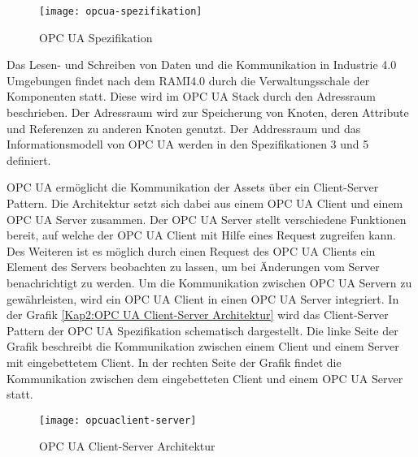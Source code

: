 \begin{figure}[h]
  \centering
  \texttt{[image: opcua-spezifikation]}
  \caption{OPC UA Spezifikation} 
  \label{Grundlagen:OPC UA Spezification}
\end{figure}

Das Lesen- und Schreiben von Daten und die Kommunikation in Industrie 4.0 Umgebungen findet nach dem \ac{RAMI4.0} durch die Verwaltungsschale der Komponenten statt. Diese wird im \ac{OPC UA} Stack durch den Adressraum beschrieben. Der Adressraum wird zur Speicherung von Knoten, deren Attribute und Referenzen zu anderen Knoten genutzt. Der Addressraum und das Informationsmodell von \ac{OPC UA} werden in den Spezifikationen 3 \cite{opcpt3} und 5 \cite{opcpt5} definiert.

\ac{OPC UA} ermöglicht die Kommunikation der Assets über ein Client-Server Pattern. Die Architektur setzt sich dabei aus einem \ac{OPC UA} Client und einem \ac{OPC UA} Server zusammen. Der \ac{OPC UA} Server stellt verschiedene Funktionen bereit, auf welche der \ac{OPC UA} Client mit Hilfe eines Request zugreifen kann. Des Weiteren ist es möglich durch einen Request des \ac{OPC UA} Clients ein Element des Servers beobachten zu lassen, um bei Änderungen vom Server benachrichtigt zu werden. Um die Kommunikation zwischen \ac{OPC UA} Servern zu gewährleisten, wird ein \ac{OPC UA} Client in einen \ac{OPC UA} Server integriert. In der Grafik \autoref{Kap2:OPC UA Client-Server Architektur} wird das Client-Server Pattern der \ac{OPC UA} Spezifikation schematisch dargestellt. Die linke Seite der Grafik beschreibt die Kommunikation zwischen einem Client und einem Server mit eingebettetem Client. In der rechten Seite der Grafik findet die Kommunikation zwischen dem eingebetteten Client und einem \ac{OPC UA} Server statt.

\begin{figure}[h]
  \centering
  \texttt{[image: opcuaclient-server]}
  \caption{OPC UA Client-Server Architektur}
  \label{Kap2:OPC UA Client-Server Architektur}
\end{figure}


